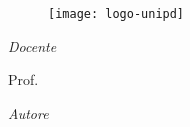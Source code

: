 \frontmatter

\begin{titlepage}

\begin{center}

\begin{LARGE}
\textbf{\myUni}											%
\end{LARGE}

\vspace{10pt}											%

\begin{Large}
\textsc{\myDepartment}								%
\end{Large}

\vspace{10pt}											%

\begin{large}
\textsc{\myFaculty}										%
\end{large}

\vspace{30pt}											%

\begin{figure}[htbp]									  %
\begin{center}											%
\texttt{[image: logo-unipd]}			%
\end{center}

\end{figure}

\vspace{30pt}											%

\begin{center}											%
\begin{LARGE}
\textbf{\myTitle}
\end{LARGE}
\end{center}

\begin{large}
\begin{flushleft}											%
\textit{Docente}

\vspace{5pt}
Prof. \myProf
\end{flushleft}

\begin{flushright}										%
\textit{Autore}


\end{flushright}
\end{large}
\end{center}
\end{titlepage}
